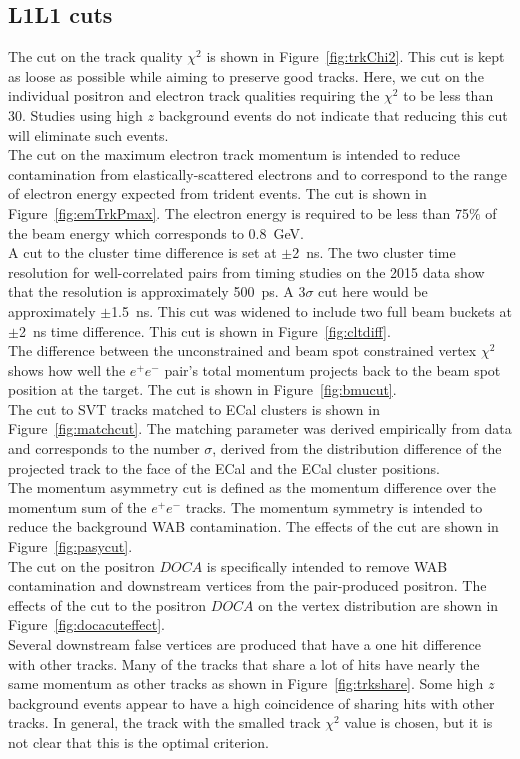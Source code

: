 \subsection{L1L1 cuts}
The cut on the track quality $\chi^2$ is shown in Figure~\ref{fig:trkChi2}. This cut is kept as loose as possible while aiming to preserve good tracks. Here, we cut on the individual positron and electron track qualities requiring the $\chi^2$ to be less than 30. Studies using high $z$ background events do not indicate that reducing this cut will eliminate such events.\\ 
\indent The cut on the maximum electron track momentum is intended to reduce contamination from elastically-scattered electrons and to correspond to the range of electron energy expected from trident events.  The cut is shown in Figure~\ref{fig:emTrkPmax}. The electron energy is required to be less than 75$\%$ of the beam energy which corresponds to 0.8~GeV.\\
\indent A cut to the cluster time difference is set at $\pm$2~ns. The two cluster time resolution for well-correlated pairs from timing studies on the 2015 data show that the resolution is approximately 500~ps. A 3$\sigma$ cut here would be approximately $\pm$1.5~ns. This cut was widened to include two full beam buckets at $\pm$2~ns time difference. This cut is shown in Figure~\ref{fig:cltdiff}.\\
\indent The difference between the unconstrained and beam spot constrained vertex $\chi^2$ shows how well the $e^+e^-$ pair's total momentum projects back to the beam spot position at the target. The cut is shown in Figure~\ref{fig:bmucut}.\\
\indent The cut to SVT tracks matched to ECal clusters is shown in Figure~\ref{fig:matchcut}. The matching parameter was derived empirically from data and corresponds to the number $\sigma$, derived from the distribution difference of the projected track to the face of the ECal and the ECal cluster positions.\\ 
\indent The momentum asymmetry cut is defined as the momentum difference over the momentum sum of the $e^+e^-$ tracks. The momentum symmetry is intended to reduce the background WAB contamination. The effects of the cut are shown in Figure~\ref{fig:pasycut}.\\
\indent The cut on the positron $DOCA$ is specifically intended to remove WAB contamination and downstream vertices from the pair-produced positron. The effects of the cut to the positron $DOCA$ on the vertex distribution are shown in Figure~\ref{fig:docacuteffect}.\\ 
\indent Several downstream false vertices are produced that have a one hit difference with other tracks. Many of the tracks that share a lot of hits have nearly the same momentum as other tracks as shown in Figure~\ref{fig:trkshare}. Some high $z$ background events appear to have a high coincidence of sharing hits with other tracks. In general, the track with the smalled track $\chi^2$ value is chosen, but it is not clear that this is the optimal criterion. 

